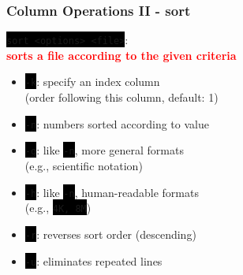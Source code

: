 \documentclass[unknownkeysallowed, 10pt, a4 paper, handout]{beamer}
\newcommand{\focus}[1]{\textbf{\textcolor{red}{#1}}}
\newcommand{\code}[1]{\colorbox{black}{\color{green}\texttt{#1}}}
\newcommand{\sidebyside}[5]{
  \begin{minipage}{#1\textwidth}
    #2
  \end{minipage} #3 \begin{minipage}{#4\textwidth}
    #5
  \end{minipage}
}
\begin{document}
\begin{frame}
  \begin{center}
    \frametitle{Column Operations II - sort}

    \sidebyside{0.62}{
      \code{sort <options> <file>}:\\
      \focus{sorts a file according to the given criteria}

      \vspace{4mm}

      \begin{itemize}
        \item \code{-k}: specify an index column\\
          (order following this column, default: 1)
        \item \code{-n}: numbers sorted according to value\\
        \item \code{-g}: like \code{-n}, more general formats\\
          (e.g., scientific notation)
        \item \code{-h}: like \code{-n}, human-readable formats\\
          (e.g., \code{4K, 8M})
        \item \code{-r}: reverses sort order (descending)
        \item \code{-u}: eliminates repeated lines
      \end{itemize}
    }{\hfill}{0.34}{
      \begin{center}

\end{center}}
\end{center}
\end{frame}
\end{document}

